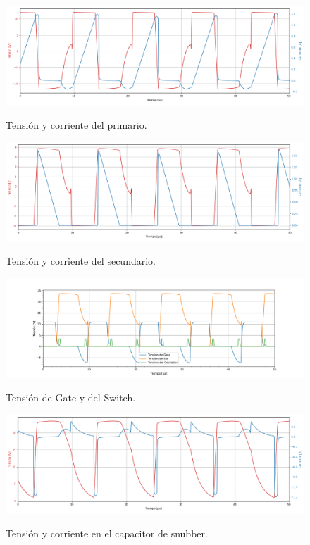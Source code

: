 \begin{figure}[H]
	\centering
	\includegraphics[width=0.9\linewidth]{ImagenesParteIII/Primario.png}
	\label{fig:primario}
	\caption{Tensión y corriente del primario.}
\end{figure}

\begin{figure}[H]
	\centering
	\includegraphics[width=0.9\linewidth]{ImagenesParteIII/Secundario.png}
	\label{fig:secundario}
	\caption{Tensión y corriente del secundario.}
\end{figure}

\begin{figure}[H]
	\centering
	\includegraphics[width=\linewidth]{ImagenesParteIII/TensionesVarias1.png}
	\label{fig:tensionesvarias}
	\caption{Tensión de Gate y del Switch.}
\end{figure}
\begin{figure}[H]
	\centering
	\includegraphics[width=0.9\linewidth]{ImagenesParteIII/Cap_snub.png}
	\label{fig:tensionesvarias}
	\caption{Tensión y corriente en el capacitor de snubber.}
\end{figure}
%